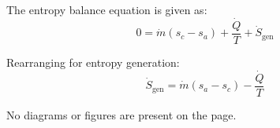 The entropy balance equation is given as:  
\[
0 = \dot{m} \left( s_c - s_a \right) + \frac{\dot{Q}}{T} + \dot{S}_{\text{gen}}
\]  

Rearranging for entropy generation:  
\[
\dot{S}_{\text{gen}} = \dot{m} \left( s_a - s_c \right) - \frac{\dot{Q}}{T}
\]  

No diagrams or figures are present on the page.